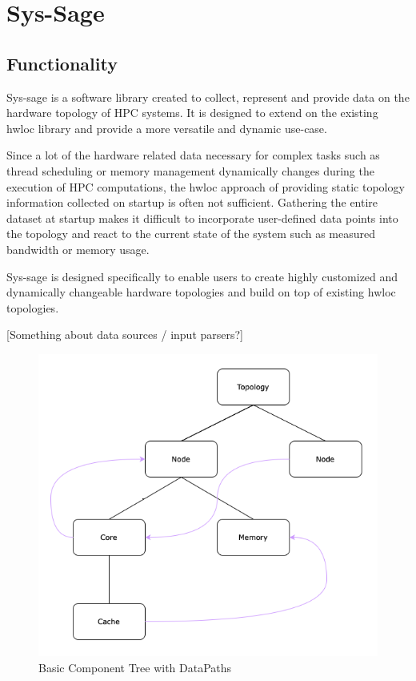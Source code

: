
\chapter{Sys-Sage}\label{chapter:sys_sage}
\section{Functionality}
Sys-sage is a software library created to collect, represent and provide data on the hardware topology of HPC systems.
It is designed to extend on the existing hwloc library and provide a more versatile and dynamic use-case.

Since a lot of the hardware related data necessary for complex tasks such as thread scheduling or memory management dynamically changes during the execution of
HPC computations, the hwloc approach of providing static topology information collected on startup is often not sufficient.
Gathering the entire dataset at startup makes it difficult to incorporate user-defined data points into the topology and react to the current state of the system
such as measured bandwidth or memory usage.

Sys-sage is designed specifically to enable users to create highly customized and dynamically changeable hardware topologies and build on top of existing hwloc topologies.

[Something about data sources / input parsers?]

\begin{figure}[ht]
    \includegraphics[scale=0.3]{images/Topology_Example.png} %
    \centering
    \caption{Basic Component Tree with DataPaths}
    \label{figure:topology_example}
\end{figure}

